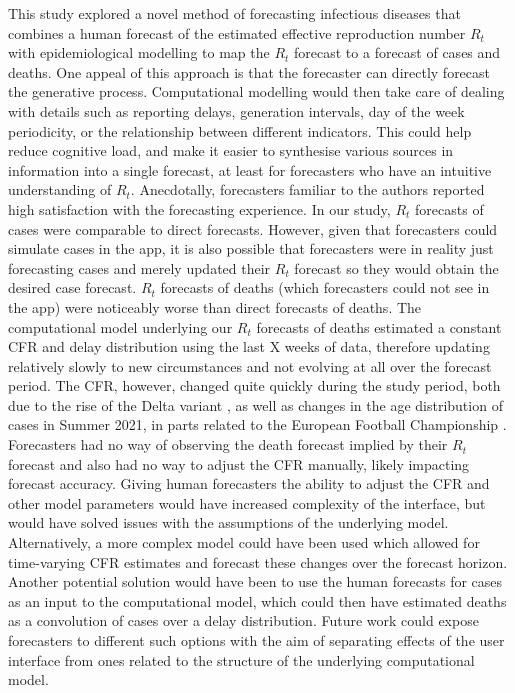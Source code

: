\documentclass[10pt,a4paper,twocolumn]{article}
\begin{document}
This study explored a novel method of forecasting infectious diseases that combines a human forecast of the estimated effective reproduction number $R_t$ with epidemiological modelling to map the $R_t$ forecast to a forecast of cases and deaths. One appeal of this approach is that the forecaster can directly forecast the generative process. Computational modelling would then take care of dealing with details such as reporting delays, generation intervals, day of the week periodicity, or the relationship between different indicators. This could help reduce cognitive load, and make it easier to synthesise various sources in information into a single forecast, at least for forecasters who have an intuitive understanding of $R_t$. Anecdotally, forecasters familiar to the authors reported high satisfaction with the forecasting experience. In our study, $R_t$ forecasts of cases were comparable to direct forecasts. However, given that forecasters could simulate cases in the app, it is also possible that forecasters were in reality just forecasting cases and merely updated their $R_t$ forecast so they would obtain the desired case forecast. 
$R_t$ forecasts of deaths (which forecasters could not see in the app) were noticeably worse than direct forecasts of deaths. The computational model underlying our $R_t$ forecasts of deaths estimated a constant CFR and delay distribution using the last X weeks of data, therefore updating relatively slowly to new circumstances and not evolving at all over the forecast period. The CFR, however, changed quite quickly during the study period, both due to the rise of the Delta variant \citep{bastIncreasedRiskHospitalisation2021}, as well as changes in the age distribution of cases in Summer 2021, in parts related to the European Football Championship \citep{dehningImpactEuro20202023}. Forecasters had no way of observing the death forecast implied by their $R_t$ forecast and also had no way to adjust the CFR manually, likely impacting forecast accuracy. Giving human forecasters the ability to adjust the CFR and other model parameters would have increased complexity of the interface, but would have solved issues with the assumptions of the underlying model. Alternatively, a more complex model could have been used which allowed for time-varying CFR estimates and forecast these changes over the forecast horizon. Another potential solution would have been to use the human forecasts for cases as an input to the computational model, which could then have estimated deaths as a convolution of cases over a delay distribution. Future work could expose forecasters to different such options with the aim of separating effects of the user interface from ones related to the structure of the underlying computational model.
\end{document}
